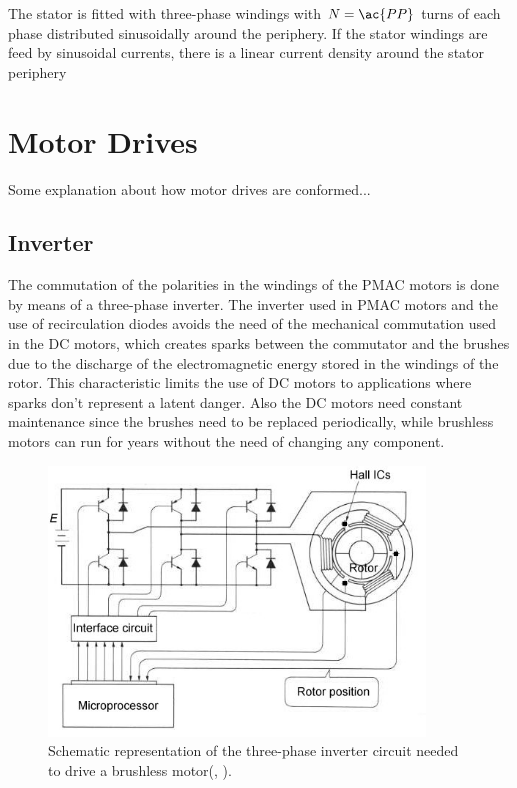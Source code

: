 The stator is fitted with three-phase windings with $N=\ac{PP}$ turns of each phase distributed sinusoidally around the periphery. If the stator windings are feed by sinusoidal currents, there is a linear current density around the stator periphery

\section{Motor Drives}\label{section:drives}

Some explanation about how motor drives are conformed...\\

\subsection{Inverter}

The commutation of the polarities in the windings of the \ac{PMAC} motors is done by means of a three-phase inverter. The inverter used in \ac{PMAC} motors and the use of recirculation diodes avoids the need of the mechanical commutation used in the \ac{DC} motors, which creates sparks between the commutator and the brushes due to the discharge of the electromagnetic energy stored in the windings of the rotor. This characteristic limits the use of \ac{DC} motors to applications where sparks don't represent a latent danger. Also the \ac{DC} motors need constant maintenance since the brushes need to be replaced periodically, while brushless motors can run for years without the need of changing any component.

\begin{figure}[htbp]
\centering
\includegraphics[width=10cm]{Images/inverter_1.png} 
\caption[Three-Phase Inverter]{Schematic representation of the three-phase inverter circuit needed to drive a brushless motor(\citeauthor{microchip}, \citeyear{microchip}).}
\label{fig:inverter_1}
\end{figure}

